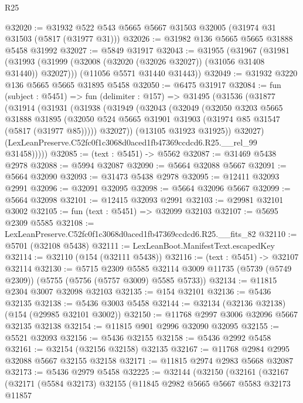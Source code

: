 \begin{lexlean}{R25}
\begin{coremodule}
@32020 := @31932 @522 @543 @5665 @5667 @31503 @32005 (@31974 @31 @31503 (@5817 (@31977 @31)))
@32026 := @31982 @136 @5665 @5665 @31888 @5458 @31992
@32027 := @5849 @31917
@32043 := @31955
    (@31967
      (@31981 (@31993 (@31999 (@32008 (@32020 (@32026 @32027)) (@31056 @31408 @31440)) @32027)))
      (@11056 @5571 @31440 @31443))
@32049 := @31932 @3220 @136 @5665 @5665 @31895 @5458
@32050 := @6475 @31917
@32084 := fun (subject : @5451) =>
  fun (delimiter : @157) =>
  @31495
    (@31536
      (@31877
        (@31914
          (@31931
            (@31938
              (@31949
                (@32043
                  (@32049
                    (@32050
                      @3203
                      @5665
                      @31888
                      @31895
                      (@32050 @524 @5665 @31901 @31903 (@31974 @85 @31547 (@5817 (@31977 @85)))))
                    @32027))
                (@13105 @31923 @31925))
              @32027)
            (LexLeanPreserve.C52fc0f1c3068d0aced1fb47369ccdcd6.R25.__rel_99 @31458)))))
@32085 := (text : @5451) -> @5562
@32087 := @31469 @5438 @2978
@32088 := @5994 @32087
@32090 := @5664 @32088 @5667
@32091 := @5664 @32090
@32093 := @31473 @5438 @2978
@32095 := @12411 @32093 @2991
@32096 := @32091 @32095
@32098 := @5664 @32096 @5667
@32099 := @5664 @32098
@32101 := @12415 @32093 @2991
@32103 := @29981 @32101 @3002
@32105 := fun (text : @5451) => @32099 @32103
@32107 := @5695 @2309 @5585
@32108 := LexLeanPreserve.C52fc0f1c3068d0aced1fb47369ccdcd6.R25.__fits_82
@32110 := @5701 (@32108 @5438)
@32111 := LexLeanBoot.ManifestText.escapedKey
@32114 := @32110 (@154 (@32111 @5438))
@32116 := (text : @5451) -> @32107 @32114
@32130 := @5715
    @2309
    @5585
    @32114
    @3009
    @11735
    (@5739 (@5749 @2309))
    (@5755 (@5756 (@5757 @3009) @5585 @5733))
@32134 := @11815 @2304 @3007 @32098 @32103
@32135 := @154 @32101
@32136 := @5436 @32135
@32138 := @5436 @3003 @5458
@32144 := @32134 (@32136 @32138) (@154 (@29985 @32101 @3002))
@32150 := @11768 @2997 @3006 @32096 @5667 @32135 @32138
@32154 := @11815 @901 @2996 @32090 @32095
@32155 := @5521 @32093
@32156 := @5436 @32155
@32158 := @5436 @2992 @5458
@32161 := @32154 (@32156 @32158) @32135
@32167 := @11768 @2984 @2995 @32088 @5667 @32155 @32158
@32171 := @11815 @2974 @2983 @5668 @32087
@32173 := @5436 @2979 @5458
@32225 := @32144
    (@32150
      (@32161
        (@32167
          (@32171
            (@5584 @32173)
            @32155
            (@11845
              @2982
              @5665
              @5667
              @5583
              @32173
              @11857

\end{coremodule}
\end{lexlean}
